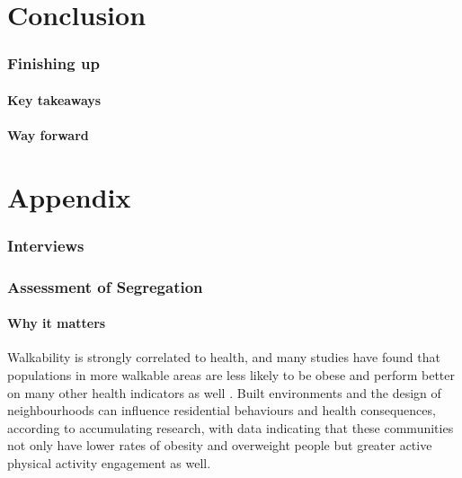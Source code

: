 \documentclass[
]{latex/krantz}
\begin{document}
\hypertarget{part-conclusion}{%
\part{Conclusion}\label{part-conclusion}}

\hypertarget{finishing-up}{%
\section{Finishing up}\label{finishing-up}}

\hypertarget{key-takeaways}{%
\subsection{Key takeaways}\label{key-takeaways}}

\hypertarget{way-forward}{%
\subsection{Way forward}\label{way-forward}}

\hypertarget{part-appendix}{%
\part{Appendix}\label{part-appendix}}

\hypertarget{interviews}{%
\section{Interviews}\label{interviews}}

\hypertarget{assessment-of-segregation}{%
\section{Assessment of Segregation}\label{assessment-of-segregation}}

\hypertarget{why-it-matters}{%
\subsection{Why it matters}\label{why-it-matters}}

Walkability is strongly correlated to health, and many studies have found that populations in more walkable areas are less likely to be obese \autocite{riggsInclusivelyWalkableExploring2016} and perform better on many other health indicators as well \autocite{suCommunityDeprivationWalkability2017}. Built environments and the design of neighbourhoods can influence residential behaviours and health consequences, according to accumulating research, with data indicating that these communities not only have lower rates of obesity and overweight people but greater active physical activity engagement as well.
\end{document}
